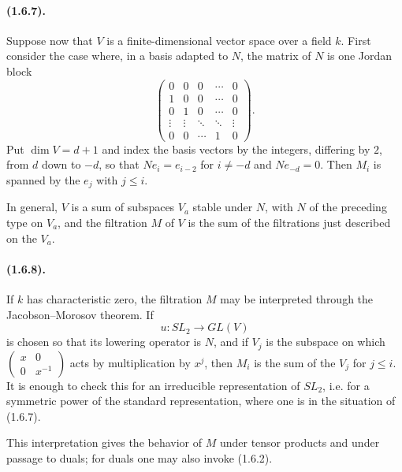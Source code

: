 \documentclass[11pt]{article}
\theoremstyle{remark}
\begin{document}
\paragraph{(1.6.7).} Suppose now that $V$ is a finite-dimensional vector space over a field $k$. First consider the case where, in a basis adapted to $N$, the matrix of $N$ is one Jordan block
\begin{equation}\tag{1.6.7.1}
\begin{pmatrix}
0&0&0&\cdots&0\\
1&0&0&\cdots&0\\
0&1&0&\cdots&0\\
\vdots&\vdots&\ddots&\ddots&\vdots\\
0&0&\cdots&1&0
\end{pmatrix}.
\end{equation}
Put $\dim V=d+1$ and index the basis vectors by the integers, differing by $2$, from $d$ down to $-d$, so that $Ne_i=e_{i-2}$ for $i\ne -d$ and $Ne_{-d}=0$. Then $M_i$ is spanned by the $e_j$ with $j\le i$.

In general, $V$ is a sum of subspaces $V_a$ stable under $N$, with $N$ of the preceding type on $V_a$, and the filtration $M$ of $V$ is the sum of the filtrations just described on the $V_a$.

\paragraph{(1.6.8).} If $k$ has characteristic zero, the filtration $M$ may be interpreted through the Jacobson--Morosov theorem. If
\[
        u:SL_2\longrightarrow GL(V)
\]
is chosen so that its lowering operator is $N$, and if $V_j$ is the subspace on which $\begin{pmatrix}x&0\\0&x^{-1}\end{pmatrix}$ acts by multiplication by $x^j$, then $M_i$ is the sum of the $V_j$ for $j\le i$. It is enough to check this for an irreducible representation of $SL_2$, i.e. for a symmetric power of the standard representation, where one is in the situation of (1.6.7).

This interpretation gives the behavior of $M$ under tensor products and under passage to duals; for duals one may also invoke (1.6.2).
\end{document}
